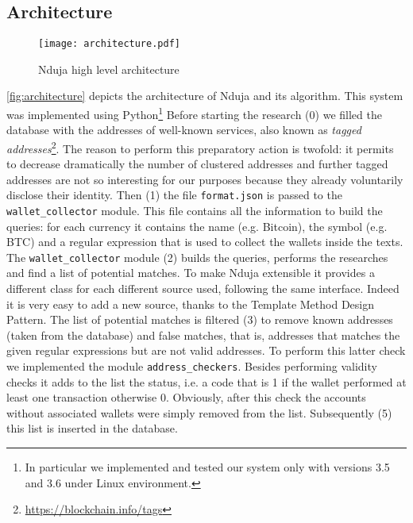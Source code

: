 \subsection{Architecture}


\begin{figure*}
	\centering
	\texttt{[image: architecture.pdf]}
	\caption{Nduja high level architecture}
	\label{fig:architecture}
\end{figure*}



\autoref{fig:architecture} depicts the architecture of Nduja and its algorithm.
This system was implemented using Python\footnote{
	In particular we implemented and tested our system only with versions
	3.5 and 3.6 under Linux environment.}
Before starting the research (0) we filled the database with the addresses of
well-known services, also known as
\emph{tagged addresses}\footnote{\url{https://blockchain.info/tags}}.
The reason to perform this preparatory action 
is twofold: it permits to decrease dramatically the number of
clustered addresses and further tagged addresses are not so
interesting for our purposes because they already voluntarily disclose their
identity.
Then (1) the file \texttt{format.json} is passed to the \verb|wallet_collector|
module. This file contains all the information to build the queries: for each
currency it contains the name (e.g. Bitcoin), the symbol (e.g. BTC) and a
regular expression that is used to collect the wallets inside the texts.
The \verb|wallet_collector| module (2) builds the queries, performs the
researches and find a list of potential matches. To make Nduja extensible it
provides a different class for each different source used, following the same
interface. Indeed it is very easy to add a new source, thanks to the Template
Method Design Pattern.
The list of potential matches is filtered (3) to remove known addresses (taken
from the database) and false matches, that is, addresses that matches the given
regular expressions but are not valid addresses. To perform this latter check
we implemented the module \verb|address_checkers|.
Besides performing validity checks it adds to the list the status, i.e. a
code that is 1 if the wallet performed at least one transaction otherwise 0.
Obviously, after this check the accounts without associated wallets were simply
removed from the list.
Subsequently (5) this list is inserted in the database.
